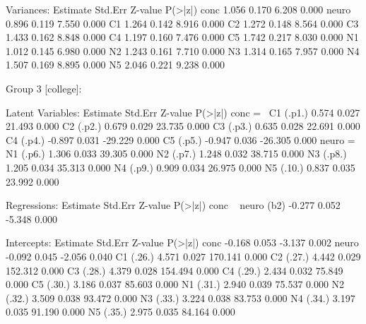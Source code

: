 \begin{Schunk}
\begin{Soutput}
Variances:
                   Estimate  Std.Err  Z-value  P(>|z|)
    conc              1.056    0.170    6.208    0.000
    neuro             0.896    0.119    7.550    0.000
    C1                1.264    0.142    8.916    0.000
    C2                1.272    0.148    8.564    0.000
    C3                1.433    0.162    8.848    0.000
    C4                1.197    0.160    7.476    0.000
    C5                1.742    0.217    8.030    0.000
    N1                1.012    0.145    6.980    0.000
    N2                1.243    0.161    7.710    0.000
    N3                1.314    0.165    7.957    0.000
    N4                1.507    0.169    8.895    0.000
    N5                2.046    0.221    9.238    0.000


Group 3 [college]:

Latent Variables:
                   Estimate  Std.Err  Z-value  P(>|z|)
  conc =~                                             
    C1      (.p1.)    0.574    0.027   21.493    0.000
    C2      (.p2.)    0.679    0.029   23.735    0.000
    C3      (.p3.)    0.635    0.028   22.691    0.000
    C4      (.p4.)   -0.897    0.031  -29.229    0.000
    C5      (.p5.)   -0.947    0.036  -26.305    0.000
  neuro =~                                            
    N1      (.p6.)    1.306    0.033   39.305    0.000
    N2      (.p7.)    1.248    0.032   38.715    0.000
    N3      (.p8.)    1.205    0.034   35.313    0.000
    N4      (.p9.)    0.909    0.034   26.975    0.000
    N5      (.10.)    0.837    0.035   23.992    0.000

Regressions:
                   Estimate  Std.Err  Z-value  P(>|z|)
  conc ~                                              
    neuro     (b2)   -0.277    0.052   -5.348    0.000

Intercepts:
                   Estimate  Std.Err  Z-value  P(>|z|)
    conc             -0.168    0.053   -3.137    0.002
    neuro            -0.092    0.045   -2.056    0.040
    C1      (.26.)    4.571    0.027  170.141    0.000
    C2      (.27.)    4.442    0.029  152.312    0.000
    C3      (.28.)    4.379    0.028  154.494    0.000
    C4      (.29.)    2.434    0.032   75.849    0.000
    C5      (.30.)    3.186    0.037   85.603    0.000
    N1      (.31.)    2.940    0.039   75.537    0.000
    N2      (.32.)    3.509    0.038   93.472    0.000
    N3      (.33.)    3.224    0.038   83.753    0.000
    N4      (.34.)    3.197    0.035   91.190    0.000
    N5      (.35.)    2.975    0.035   84.164    0.000


\end{Soutput}
\end{Schunk}
